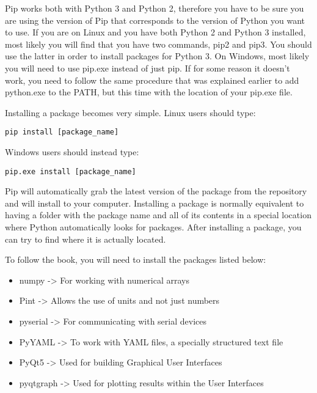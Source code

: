 Pip works both with Python 3 and Python 2, therefore you have to be sure you are using the version of Pip that corresponds to the version of Python you want to use. If you are on Linux and you have both Python 2 and Python 3 installed, most likely you will find that you have two commands, pip2 and pip3. You should use the latter in order to install packages for Python 3. On Windows, most likely you will need to use pip.exe instead of just pip. If for some reason it doesn’t work, you need to follow the same procedure that was explained earlier to add python.exe to the PATH, but this time with the location of your pip.exe file.

Installing a package becomes very simple. Linux users should type:
\begin{verbatim}
pip install [package_name]
\end{verbatim}

Windows users should instead type:
\begin{verbatim}
pip.exe install [package_name]
\end{verbatim}

Pip will automatically grab the latest version of the package from the repository and will install to your computer. Installing a package is normally equivalent to having a folder with the package name and all of its contents in a special location where Python automatically looks for packages. After installing a package, you can try to find where it is actually located.

To follow the book, you will need to install the packages listed below:
\begin{itemize}
 \item numpy -> For working with numerical arrays
 \item Pint -> Allows the use of units and not just numbers
 \item pyserial -> For communicating with serial devices
 \item PyYAML -> To work with YAML files, a specially structured text file
 \item PyQt5 -> Used for building Graphical User Interfaces
 \item pyqtgraph -> Used for plotting results within the User Interfaces
\end{itemize}



